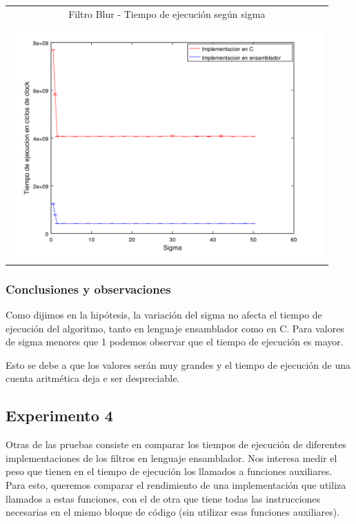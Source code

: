 			{\centering \begin{tabular}{c}
	      		{\small Filtro Blur - Tiempo de ejecución según sigma} \\
	      			\includegraphics[width=12cm]{../exp/graficos/exp3-tiempo_segun_sigma.png} \\
	    		\end{tabular}}

			\subsubsection*{Conclusiones y observaciones}
				Como dijimos en la hipótesis, la variación del sigma no afecta el tiempo de ejecución del algoritmo, tanto en lenguaje ensamblador como en C. Para valores de sigma menores que 1 podemos observar que el tiempo de ejecución es mayor.

				Esto se debe a que los valores serán muy grandes y el tiempo de ejecución de una cuenta aritmética deja e ser despreciable. 

	\subsection{Experimento 4}
		Otras de las pruebas consiste en comparar los tiempos de ejecución de diferentes implementaciones de los filtros en lenguaje ensamblador. Nos interesa medir el peso que tienen en el tiempo de ejecución los llamados a funciones auxiliares. Para esto, queremos comparar el rendimiento de una implementación que utiliza llamados a estas funciones, con el de otra que tiene todas las instrucciones necesarias en el mismo bloque de código (sin utilizar esas funciones auxiliares). 
		

